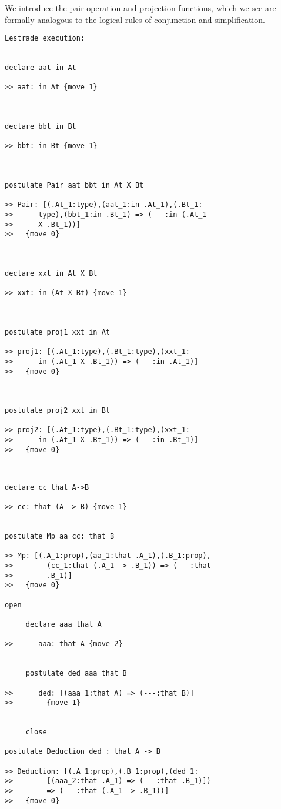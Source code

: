 \documentclass[12pt]{article}
\begin{document}
We introduce the pair operation and projection functions, which we see are formally analogous to the logical rules of conjunction and simplification.

\begin{verbatim}Lestrade execution:


declare aat in At

>> aat: in At {move 1}



declare bbt in Bt

>> bbt: in Bt {move 1}



postulate Pair aat bbt in At X Bt

>> Pair: [(.At_1:type),(aat_1:in .At_1),(.Bt_1:
>>      type),(bbt_1:in .Bt_1) => (---:in (.At_1
>>      X .Bt_1))]
>>   {move 0}



declare xxt in At X Bt

>> xxt: in (At X Bt) {move 1}



postulate proj1 xxt in At

>> proj1: [(.At_1:type),(.Bt_1:type),(xxt_1:
>>      in (.At_1 X .Bt_1)) => (---:in .At_1)]
>>   {move 0}



postulate proj2 xxt in Bt

>> proj2: [(.At_1:type),(.Bt_1:type),(xxt_1:
>>      in (.At_1 X .Bt_1)) => (---:in .Bt_1)]
>>   {move 0}


\end{verbatim}

     \begin{verbatim}

declare cc that A->B

>> cc: that (A -> B) {move 1}


postulate Mp aa cc: that B

>> Mp: [(.A_1:prop),(aa_1:that .A_1),(.B_1:prop),
>>        (cc_1:that (.A_1 -> .B_1)) => (---:that 
>>        .B_1)]
>>   {move 0}

open

     declare aaa that A

>>      aaa: that A {move 2}


     postulate ded aaa that B

>>      ded: [(aaa_1:that A) => (---:that B)]
>>        {move 1}


     close

postulate Deduction ded : that A -> B

>> Deduction: [(.A_1:prop),(.B_1:prop),(ded_1:
>>        [(aaa_2:that .A_1) => (---:that .B_1)])
>>        => (---:that (.A_1 -> .B_1))]
>>   {move 0}

\end{verbatim}
\end{document}
